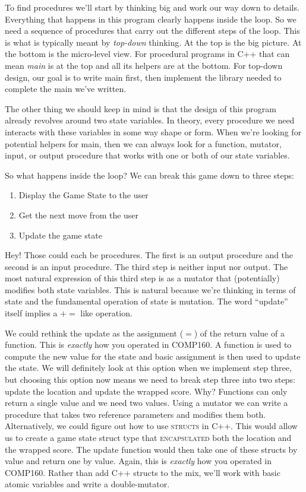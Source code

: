 \documentclass[nobib]{tufte-handout}
\begin{document}
To find procedures we'll start by thinking big and work our way down to details. Everything that happens in this program clearly happens inside the loop. So we need a sequence of procedures that carry out the different steps of the loop. This is what is typically meant by \textit{top-down} thinking. At the top is the big picture. At the bottom is the micro-level view. For procedural programs in C++ that can mean \textit{main} is at the top and all its helpers are at the bottom. For top-down design, our goal is to write main first, then implement the library needed to complete the main we've written. 

The other thing we should keep in mind is that the design of this program already revolves around two state variables. In theory, every procedure we need interacts with these variables in some way shape or form. When we're looking for potential helpers for main, then we can always look for a function, mutator, input, or output procedure that works with one or both of our state variables. 

So what happens inside the loop? We can break this game down to three steps:
\begin{enumerate}
\item Display the Game State to the user
\item Get the next move from the user
\item Update the game state
\end{enumerate}
Hey! Those could each be procedures. The first is an output procedure and the second is an input procedure. The third step is neither input nor output. The most natural expression of this third step is as a mutator that (potentially) modifies both state variables. This is natural because we're thinking in terms of state and the fundamental operation of state is mutation. The word ``update'' itself implies a $+=$ like operation. 

We could rethink the update as the assignment ($=$) of the return value of a function. This is \textit{exactly} how you operated in COMP160. A function is used to compute the new value for the state and basic assignment is then used to update the state. We will definitely look at this option when we implement step three, but choosing this option now means we need to break step three into two steps: update the location and update the wrapped score. Why? Functions can only return a single value and we need two values. Using a mutator we can write a procedure that takes two reference parameters and modifies them both. Alternatively, we could figure out how to use \textsc{structs} in C++. This would allow us to create a game state struct type that \textsc{encapsulated} both the location and the wrapped score. The update function would then take one of these structs by value and return one by value. Again, this is \textit{exactly} how you operated in COMP160. Rather than add C++ structs to the mix, we'll work with basic atomic variables and write a double-mutator. 
\end{document}
